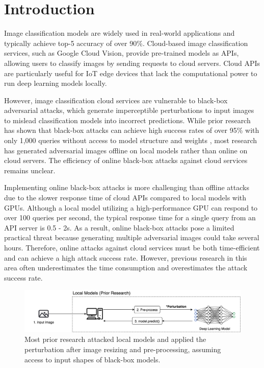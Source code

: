 

\section{Introduction}
\label{sec:introduction}
Image classification models are widely used in real-world applications and typically achieve top-5 accuracy of over 90\%. Cloud-based image classification services, such as Google Cloud Vision, provide pre-trained models as APIs, allowing users to classify images by sending requests to cloud servers. Cloud APIs are particularly useful for IoT edge devices that lack the computational power to run deep learning models locally.


However, image classification cloud services are vulnerable to black-box adversarial attacks, which generate imperceptible perturbations to input images to mislead classification models into incorrect predictions. While prior research has shown that black-box attacks can achieve high success rates of over 95\% with only 1,000 queries without access to model structure and weights \citep{bhambri2019survey}, most research has generated adversarial images offline on local models rather than online on cloud servers. The efficiency of online black-box attacks against cloud services remains unclear.

Implementing online black-box attacks is more challenging than offline attacks due to the slower response time of cloud APIs compared to local models with GPUs. Although a local model utilizing a high-performance GPU can respond to over 100 queries per second, the typical response time for a single query from an API server is 0.5 - 2s. As a result, online black-box attacks pose a limited practical threat because generating multiple adversarial images could take several hours. Therefore, online attacks against cloud services must be both time-efficient and can achieve a high attack success rate. However, previous research in this area often underestimates the time consumption and overestimates the attack success rate.

\begin{figure}[tbp]
    \centering
    \includegraphics[width=\linewidth]{figures/chapter_classification/local.jpg}
    \caption{Most prior research attacked local models and applied the perturbation after image resizing and pre-processing, assuming access to input shapes of black-box models.}
    \label{fig:local}
\end{figure}

